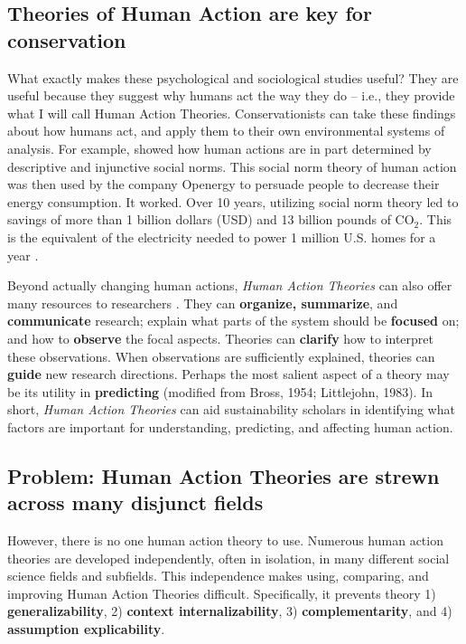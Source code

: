 \documentclass[12 pt]{article}
\begin{document}
\subsection{Theories of Human Action are key for conservation}
What exactly makes these psychological and sociological studies useful? They are useful because they suggest why humans act the way they do -- i.e., they provide what I will call Human Action Theories.  Conservationists can take these findings about how humans act, and apply them to their own environmental systems of analysis. For example,  \textcite{Schultz2007} showed how human actions are in part determined by descriptive and injunctive social norms. This social norm theory of human action was then used by the company Openergy to persuade people to decrease their energy consumption. It worked. Over 10 years, utilizing social norm theory led to savings of more than  1 billion  dollars (USD) and 13 billion pounds of CO$_{\text{2}}$. This is the equivalent of the electricity needed to power 1 million U.S. homes for a year \parencite{Schultz2018}. 

Beyond actually changing human actions, \textit{Human Action Theories} can also offer many resources to researchers \parencite{Fawcett1978}. They can \textbf{organize, summarize}, and \textbf{communicate} research; explain what parts of the system should be \textbf{focused} on; and how to \textbf{observe} the focal aspects. Theories can \textbf{clarify} how to interpret these observations. When observations are sufficiently explained, theories can \textbf{guide} new research directions.  Perhaps  the most salient aspect of a theory may be its utility in \textbf{predicting} (modified from Bross, 1954; Littlejohn, 1983). In short, \textit{Human Action Theories} can aid sustainability scholars in identifying what factors are important for understanding, predicting, and affecting human action. 

\subsection{Problem: Human Action Theories are strewn across many disjunct fields}

However, there is no one human action theory to use.  Numerous human action theories are developed independently,  often in isolation, in many different social science fields and subfields. This independence makes using, comparing, and improving Human Action Theories difficult. Specifically, it prevents theory 1) \textbf{generalizability}, 2) \textbf{context internalizability}, 3) \textbf{complementarity}, and 4) \textbf{assumption explicability}.
\end{document}
